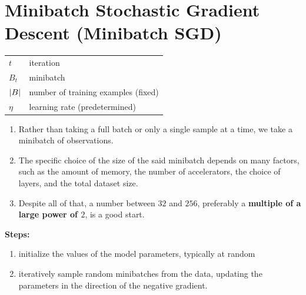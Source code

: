 


\section{Minibatch Stochastic Gradient Descent (Minibatch SGD) \cite{dnn-1}}\label{Minibatch Stochastic Gradient Descent (Minibatch SGD)}

\begin{customTableWrapper}{1.1}
\begin{table}[H]
    \centering
    \begin{tabular}{l l}
        $t$ & iteration \\
        $B_t$ & minibatch \\
        $\left| B \right|$ & number of training examples (fixed) \\
        $\eta$ & learning rate (predetermined) \\

    \end{tabular}
\end{table}
\end{customTableWrapper}

\begin{enumerate}[itemsep=0.2cm]
    \item Rather than taking a full batch or only a single sample at a time, we take a minibatch of observations.

    \item The specific choice of the size of the said minibatch depends on many factors, such as the amount of memory, the number of accelerators, the choice of layers, and the total dataset size. 
    
    \item Despite all of that, a number between $32$ and $256$, preferably a \textbf{multiple of a large power of $2$}, is a good start.

\end{enumerate}


\noindent
\textbf{Steps:}
\begin{enumerate}
    \item initialize the values of the model parameters, typically at random

    \item iteratively sample random minibatches from the data, updating the parameters in the direction of the negative gradient.

\end{enumerate}

